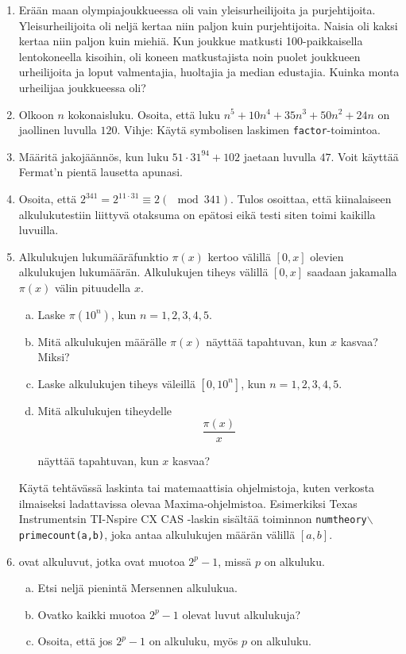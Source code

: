 \begin{enumerate}
\item Erään maan olympiajoukkueessa oli vain yleisurheilijoita ja
purjehtijoita. Yleisurheilijoita oli neljä kertaa niin paljon kuin
purjehtijoita. Naisia oli kaksi kertaa niin paljon kuin miehiä.
Kun joukkue matkusti 100-paikkaisella lentokoneella kisoihin,
oli koneen matkustajista noin puolet joukkueen urheilijoita ja
loput valmentajia, huoltajia ja median edustajia. Kuinka monta
urheilijaa joukkueessa oli?

\item Olkoon $n$ kokonaisluku. Osoita, että luku
$n^5+10n^4+35n^3+50n^2+24n$ on jaollinen luvulla $120$. Vihje:
Käytä symbolisen laskimen {\tt factor}-toimintoa.

\item
Määritä jakojäännös, kun luku $51\cdot 31^{94}+102$ jaetaan
luvulla $47$. Voit käyttää Fermat'n pientä lausetta apunasi.

\item Osoita, että $2^{341} = 2^{11 \cdot 31} \equiv 2 (\mod 341)
$. Tulos osoittaa, että kiinalaiseen alkulukutestiin liittyvä
otaksuma on epätosi eikä testi siten toimi kaikilla luvuilla.

\item
Alkulukujen lukumääräfunktio $\pi(x)$ kertoo välillä $[0,x]$
olevien alkulukujen lukumäärän. Alkulukujen tiheys välillä $[0,x]
$ saadaan jakamalla $\pi(x)$ välin pituudella $x$.
\begin{enumerate}[a)]
\item Laske $\pi(10^n)$, kun $n=1,2,3,4,5$.
\item Mitä alkulukujen määrälle $\pi(x)$ näyttää tapahtuvan,
kun $x$ kasvaa? Miksi?
\item Laske alkulukujen tiheys väleillä $[0,10^n]$, kun
$n=1,2,3,4,5$.
\item Mitä alkulukujen tiheydelle
\[
\frac{\pi(x)}{x}
\]

näyttää tapahtuvan, kun $x$ kasvaa?
\end{enumerate}
Käytä tehtävässä laskinta tai matemaattisia ohjelmistoja, kuten
verkosta ilmaiseksi ladattavissa olevaa Maxima-ohjelmistoa.
Esimerkiksi Texas Instrumentsin TI-Nspire CX CAS -laskin sisältää
toiminnon {\tt numtheory$\backslash$primecount(a,b)}, joka antaa
alkulukujen määrän välillä $[a,b]$.

\item {} ovat alkuluvut, jotka ovat
muotoa $2^p - 1$, missä $p$ on alkuluku.
\begin{enumerate}[a)]
\item Etsi neljä pienintä Mersennen alkulukua.
\item Ovatko kaikki muotoa $2^p - 1$ olevat luvut alkulukuja?
\item Osoita, että jos $2^p - 1$ on alkuluku, myös $p$ on
alkuluku.


\end{enumerate}
\end{enumerate}
